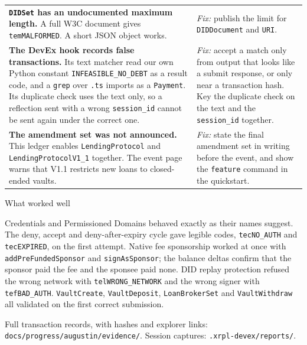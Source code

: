 \documentclass[10pt,a4paper]{article}
\begin{document}
\begin{longtable}{@{}>{\fontsize{8.6}{11}\selectfont\RaggedRight}p{58mm}@{\hspace{5mm}}>{\fontsize{8.6}{11}\selectfont\RaggedRight}p{105mm}@{}}
\textbf{\texttt{DIDSet} has an undocumented maximum length.} A full W3C document gives \texttt{temMALFORMED}. A short JSON object works. & \emph{Fix:} publish the limit for \texttt{DIDDocument} and \texttt{URI}.\\[3pt]
\textbf{The DevEx hook records false transactions.} Its text matcher read our own Python constant \texttt{INFEASIBLE\_NO\_DEBT} as a result code, and a \texttt{grep} over \texttt{.ts} imports as a \texttt{Payment}. Its duplicate check uses the text only, so a reflection sent with a wrong \texttt{session\_id} cannot be sent again under the correct one. & \emph{Fix:} accept a match only from output that looks like a submit response, or only near a transaction hash. Key the duplicate check on the text and the \texttt{session\_id} together.\\[3pt]
\textbf{The amendment set was not announced.} This ledger enables \texttt{LendingProtocol} and \texttt{LendingProtocolV1\_1} together. The event page warns that V1.1 restricts new loans to closed-ended vaults. & \emph{Fix:} state the final amendment set in writing before the event, and show the \texttt{feature} command in the quickstart.\\
\end{longtable}

\vspace{3pt}
{\displayfont\fontsize{13}{16}\selectfont\color{forest}What worked well\par}
\vspace{0.5mm}
Credentials and Permissioned Domains behaved exactly as their names suggest. The deny, accept and deny-after-expiry cycle gave legible codes, \texttt{tecNO\_AUTH} and \texttt{tecEXPIRED}, on the first attempt. Native fee sponsorship worked at once with \texttt{addPreFundedSponsor} and \texttt{signAsSponsor}; the balance deltas confirm that the sponsor paid the fee and the sponsee paid none. DID replay protection refused the wrong network with \texttt{telWRONG\_NETWORK} and the wrong signer with \texttt{tefBAD\_AUTH}. \texttt{VaultCreate}, \texttt{VaultDeposit}, \texttt{LoanBrokerSet} and \texttt{VaultWithdraw} all validated on the first correct submission.

\vspace{2pt}
{\fontsize{8.2}{10.5}\selectfont\color{muted}Full transaction records, with hashes and explorer links: \texttt{docs/progress/augustin/evidence/}. Session captures: \texttt{.xrpl-devex/reports/}.\par}
\end{document}
